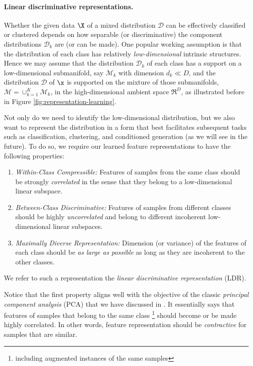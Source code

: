 \documentclass[../../book-main.tex]{subfiles}
\begin{document}
\paragraph{Linear discriminative representations.}
Whether the given data $\X$ of a mixed distribution $\mathcal{D}$ can be effectively classified or clustered depends on how separable (or discriminative) the component distributions $\mathcal{D}_k$ are (or can be made). One popular working assumption is that the distribution of each class has relatively {\em low-dimensional} intrinsic structures. Hence we may assume that the distribution $\mathcal{D}_k$ of each class has a support on a low-dimensional submanifold, say $\mathcal{M}_k$ with dimension $d_k \ll D$, and the distribution $\mathcal D$ of $\x$ is supported on the mixture of those submanifolds, $\mathcal M = \cup_{k=1}^K \mathcal{M}_k$,  in the high-dimensional ambient space $\Re^D$, as illustrated before in Figure \ref{fig:representation-learning}.

Not only do we need to identify the low-dimensional distribution, but we also want to represent the distribution in a form that best facilitates subsequent tasks such as classification, clustering, and conditioned generation (as we will see in the future). To do so, we require our learned feature representations to have the following properties:
\begin{enumerate}
	\item {\em Within-Class Compressible:} Features of samples from the same class should be strongly {\em correlated} in the sense that they belong to a low-dimensional linear subspace.
	\item {\em Between-Class Discriminative:} Features of samples from different classes should be highly {\em uncorrelated} and belong to different incoherent low-dimensional linear subspaces.
	\item {\em Maximally Diverse Representation:} Dimension (or variance) of the features of each class should be {\em as large as possible} as long as they are incoherent to the other classes.
\end{enumerate}
We refer to such a representation the {\em linear discriminative representation} (LDR). 

Notice that the first property aligns well with the objective of the classic {\em principal component analysis} (PCA) that we have discussed in . It essentially says that features of samples that belong to the same class \footnote{including augmented instances of the same samples} should become or be made highly correlated. In other words, feature representation should be {\em contractive} for samples that are similar. 
\end{document}
